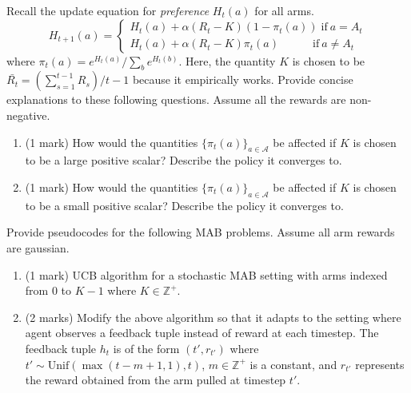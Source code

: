 \documentclass[addpoints,12pt,solution]{exam}
\begin{document}
\begin{questions}
\begin{enumerate}[label=(\alph*)]
\begin{solution}
    \end{solution}
\end{enumerate}

\question[2][REINFORCE] Recall the update equation for \textit{preference} ${H_t}(a)$ for all arms. 
\begin{equation*}
    {H_{t+1}}(a) =
    \begin{cases} 
        {H_t}(a) + {\alpha}\left({R_t} - K\right)\left(1 - {\pi_t}(a)\right) \; \text{if} \: a = {A_t} \\
        {H_t}(a) + {\alpha}\left({R_t} - K\right){\pi_t}(a) \quad\quad\quad  \text{if} \: a \neq {A_t}
    \end{cases}
\end{equation*}
\noindent where ${\pi_t}(a) = {e^{{H_t}(a)}}/{\sum_b e^{{H_t}(b)}}$. Here, the quantity $K$ is chosen to be $\bar{R_t} = \left({\sum_{s=1}^{t-1} {R_s}}\right)/{t-1}$ because it empirically works. Provide concise explanations to these following questions. Assume all the rewards are non-negative.

\begin{enumerate}[label=(\alph*)]
    \item (1 mark) How would the quantities $\{{{\pi_t}(a)}\}_{a \in \mathcal{A}}$ be affected if $K$ is chosen to be a large positive scalar? Describe the policy it converges to.
    \begin{solution}
        
    \end{solution}
    \item (1 mark) How would the quantities $\{{{\pi_t}(a)}\}_{a \in \mathcal{A}}$ be affected if $K$ is chosen to be a small positive scalar? Describe the policy it converges to.
    \begin{solution}
        
    \end{solution}
\end{enumerate}

 Provide pseudocodes for the following MAB problems. Assume all arm rewards are gaussian.
\begin{enumerate}[label=(\alph*)]
    \item (1 mark) UCB algorithm for a stochastic MAB setting with arms indexed from $0$ to $K-1$ where $K \in \mathbb{Z}^+$.
    \begin{solution}
        
    \end{solution}
    \item (2 marks) Modify the above algorithm so that it adapts to the setting where agent observes a feedback tuple instead of reward at each timestep. The feedback tuple $h_t$ is of the form $({t'}, {r_{t'}})$ where ${t'} \sim \text{Unif}(\max(t-m+1, 1), t)$, $m \in {\mathbb{Z}^+}$ is a constant, and ${r_{t'}}$ represents the reward obtained from the arm pulled at timestep $t'$. 
    \begin{solution}
        

\end{solution}
\end{enumerate}
\end{questions}
\end{document}
